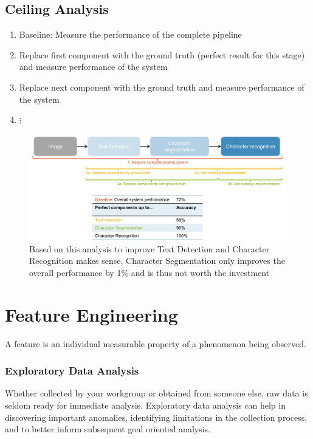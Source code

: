 \documentclass[11pt]{article}
\theoremstyle{definition}
\begin{document}
\subsection{Ceiling Analysis}
\begin{enumerate}
	\item {\color{Tomato2} Baseline}: Measure the performance of the complete pipeline
	\item Replace {\color{Goldenrod1} first component} with the ground truth (perfect result for this stage) and measure performance of the system
	\item Replace {\color{OliveDrab3} next component} with the ground truth and measure performance of the system
	\item \qquad $\vdots$
\end{enumerate}
\begin{figure}[H]
	\centering
	\includegraphics[width=\linewidth]{img/ceiling_analysis.png}
	\caption{Based on this analysis to improve Text Detection and Character Recognition makes sense, Character Segmentation only improves the overall performance by 1\% and is thus not worth the investment}
\end{figure}

\section{Feature Engineering}
A feature is an individual measurable property of a phenomenon being observed.

\subsubsection{Exploratory Data Analysis}
Whether collected by your workgroup or obtained from someone else, raw data is seldom ready for immediate analysis. Exploratory data analysis can help in discovering important anomalies, identifying limitations in the collection process, and to better inform subsequent goal oriented analysis.
\end{document}
